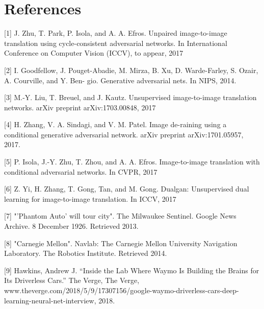 \documentclass{article}
\begin{document}
\section*{References}

\small
\label{[1]}[1] J. Zhu, T. Park, P. Isola, and A. A. Efros. Unpaired image-to-image 
translation using cycle-consistent adversarial networks. 
In International Conference on Computer Vision (ICCV), to appear, 2017

\label{[2]}[2] I. Goodfellow, J. Pouget-Abadie, M. Mirza, B. Xu, D. Warde-Farley, 
S. Ozair, A. Courville, and Y. Ben- gio. Generative adversarial nets. 
In NIPS, 2014.

\label{[3]}[3] M.-Y. Liu, T. Breuel, and J. Kautz. Unsupervised 
image-to-image translation networks. arXiv preprint arXiv:1703.00848, 2017

\label{[4]}[4] H. Zhang, V. A. Sindagi, and V. M. Patel. Image de-raining using a conditional generative 
adversarial network. arXiv preprint arXiv:1701.05957, 2017.

\label{[5]}[5] P. Isola, J.-Y. Zhu, T. Zhou, and A. A. Efros. 
Image-to-image translation with conditional adversarial networks. 
In CVPR, 2017

\label{[6]}[6] Z. Yi, H. Zhang, T. Gong, Tan, and M. Gong. Dualgan: 
Unsupervised dual learning for image-to-image translation. 
In ICCV, 2017

\label{[7]}[7] "'Phantom Auto' will tour city". The Milwaukee Sentinel. 
Google News Archive. 8 December 1926. Retrieved 2013.

\label{[8]}[8] "Carnegie Mellon". Navlab: The Carnegie Mellon University Navigation Laboratory. 
The Robotics Institute. Retrieved 2014.

\label{[9]}[9] Hawkins, Andrew J. “Inside the Lab Where Waymo Is Building 
the Brains for Its Driverless Cars.” The Verge, The Verge, 
www.theverge.com/2018/5/9/17307156/google-waymo-driverless-cars-deep-learning-neural-net-interview, 2018.


\end{document}
